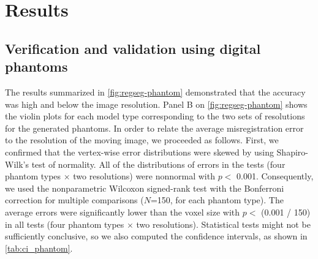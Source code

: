 \section{Results}
\label{sec:regseg-results}

\subsection{Verification and validation using digital phantoms}
\label{sec:regseg-results_phantom}

The results summarized in \autoref{fig:regseg-phantom} demonstrated that the accuracy was
  high and below the image resolution.
Panel B on \autoref{fig:regseg-phantom} shows the violin plots for each model type corresponding
  to the two sets of resolutions for the generated phantoms.
In order to relate the average misregistration error to the resolution of the moving image,
  we proceeded as follows.
First, we confirmed that the vertex-wise error distributions were skewed by using Shapiro-Wilk's test of
  normality.
All of the distributions of errors in the tests (four phantom types $\times$ two resolutions) were
  nonnormal with $p<$ 0.001.
Consequently, we used the nonparametric Wilcoxon signed-rank test with the Bonferroni
  correction for multiple comparisons ($N$=150, for each phantom type).
The average errors were significantly lower than the voxel size with $p <$ (0.001 / 150)
  in all tests (four phantom types $\times$ two resolutions).
Statistical tests might not be sufficiently conclusive, so we also computed the confidence intervals,
  as shown in \autoref{tab:ci_phantom}.

